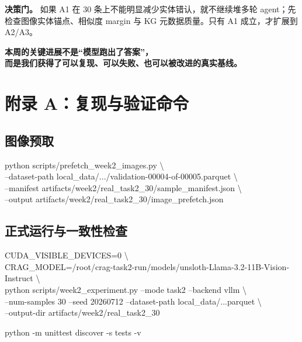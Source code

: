 \documentclass[11pt,a4paper]{ctexart}
\begin{document}
\begin{callout}
\textbf{决策门。} 如果 A1 在 30 条上不能明显减少实体错认，就不继续堆多轮 agent；先检查图像实体锚点、相似度 margin 与 KG 元数据质量。只有 A1 成立，才扩展到 A2/A3。
\end{callout}

\vfill
\begin{center}
{\fontsize{20}{28}\selectfont\bfseries\color{Navy}
本周的关键进展不是“模型跑出了答案”，\\
而是我们获得了可以复现、可以失败、也可以被改进的真实基线。}
\end{center}
\clearpage

\section{附录 A：复现与验证命令}

\subsection{图像预取}
\begin{tcolorbox}[colback=Ink,colframe=Ink,arc=2mm]
\color{white}\ttfamily\scriptsize
python scripts/prefetch\_week2\_images.py \textbackslash\\
\quad --dataset-path local\_data/.../validation-00004-of-00005.parquet \textbackslash\\
\quad --manifest artifacts/week2/real\_task2\_30/sample\_manifest.json \textbackslash\\
\quad --output artifacts/week2/real\_task2\_30/image\_prefetch.json
\end{tcolorbox}

\subsection{正式运行与一致性检查}
\begin{tcolorbox}[colback=Ink,colframe=Ink,arc=2mm]
\color{white}\ttfamily\scriptsize
CUDA\_VISIBLE\_DEVICES=0 \textbackslash\\
CRAG\_MODEL=/root/crag-task2-run/models/unsloth-Llama-3.2-11B-Vision-Instruct \textbackslash\\
python scripts/week2\_experiment.py --mode task2 --backend vllm \textbackslash\\
\quad --num-samples 30 --seed 20260712 --dataset-path local\_data/...parquet \textbackslash\\
\quad --output-dir artifacts/week2/real\_task2\_30

python -m unittest discover -s tests -v
\end{tcolorbox}
\end{document}
